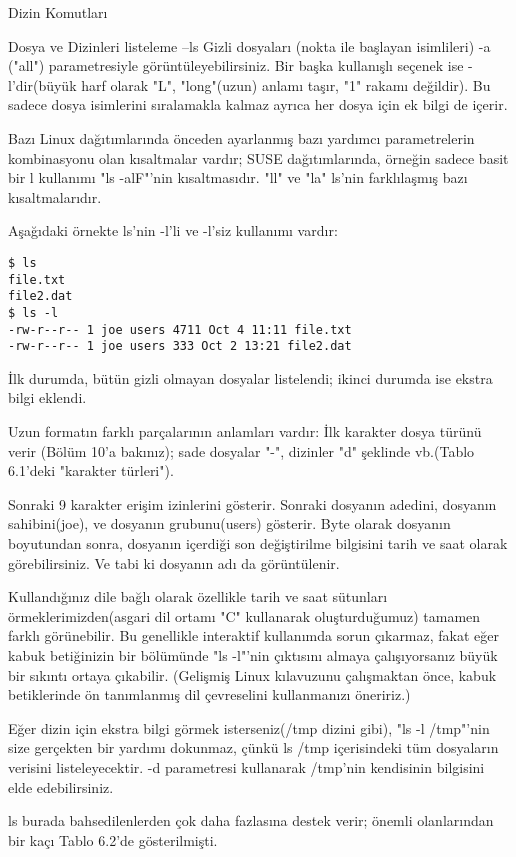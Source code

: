 \begin{section}{Dizin Komutları}
\begin{subsection}{Dosya ve Dizinleri listeleme --ls}
	Gizli dosyaları (nokta ile başlayan isimlileri) -a ("all") parametresiyle görüntüleyebilirsiniz. Bir başka kullanışlı seçenek ise -l'dir(büyük harf olarak "L", "long"(uzun) anlamı taşır, "1" rakamı değildir). Bu sadece dosya isimlerini sıralamakla kalmaz ayrıca her dosya için ek bilgi de içerir.
	
	Bazı Linux dağıtımlarında önceden ayarlanmış bazı yardımcı parametrelerin kombinasyonu olan kısaltmalar vardır; SUSE dağıtımlarında, örneğin sadece basit bir l kullanımı "ls -alF"'nin kısaltmasıdır. "ll" ve "la" ls'nin farklılaşmış bazı kısaltmalarıdır.
	
Aşağıdaki örnekte ls'nin -l'li ve -l'siz kullanımı vardır:
\begin{verbatim}
$ ls
file.txt
file2.dat
$ ls -l
-rw-r--r-- 1 joe users 4711 Oct 4 11:11 file.txt
-rw-r--r-- 1 joe users 333 Oct 2 13:21 file2.dat
\end{verbatim}

İlk durumda, bütün gizli olmayan dosyalar listelendi; ikinci durumda ise ekstra bilgi eklendi.

	Uzun formatın farklı parçalarının anlamları vardır: İlk karakter dosya türünü verir (Bölüm 10'a bakınız); sade dosyalar "-", dizinler "d" şeklinde vb.(Tablo 6.1'deki "karakter türleri").
	
	Sonraki 9 karakter erişim izinlerini gösterir. Sonraki dosyanın adedini, dosyanın sahibini(joe), ve dosyanın grubunu(users) gösterir. Byte olarak dosyanın boyutundan sonra, dosyanın içerdiği son değiştirilme bilgisini tarih ve saat olarak görebilirsiniz. Ve tabi ki dosyanın adı da görüntülenir.
	
	Kullandığınız dile bağlı olarak özellikle tarih ve saat sütunları örmeklerimizden(asgari dil ortamı "C" kullanarak oluşturduğumuz) tamamen farklı görünebilir. Bu genellikle interaktif kullanımda sorun çıkarmaz, fakat eğer kabuk betiğinizin bir bölümünde "ls -l"'nin çıktısını almaya çalışıyorsanız büyük bir sıkıntı ortaya çıkabilir. (Gelişmiş Linux kılavuzunu çalışmaktan önce, kabuk betiklerinde ön tanımlanmış dil çevreselini kullanmanızı öneririz.)
	
	Eğer dizin için ekstra bilgi görmek isterseniz(/tmp dizini gibi), "ls -l /tmp"'nin size gerçekten bir yardımı dokunmaz, çünkü ls /tmp içerisindeki tüm dosyaların verisini listeleyecektir. -d parametresi kullanarak /tmp'nin kendisinin bilgisini elde edebilirsiniz.
	
ls burada bahsedilenlerden çok daha fazlasına destek verir; önemli olanlarından bir kaçı Tablo 6.2'de gösterilmişti.


\end{subsection}
\end{section}
